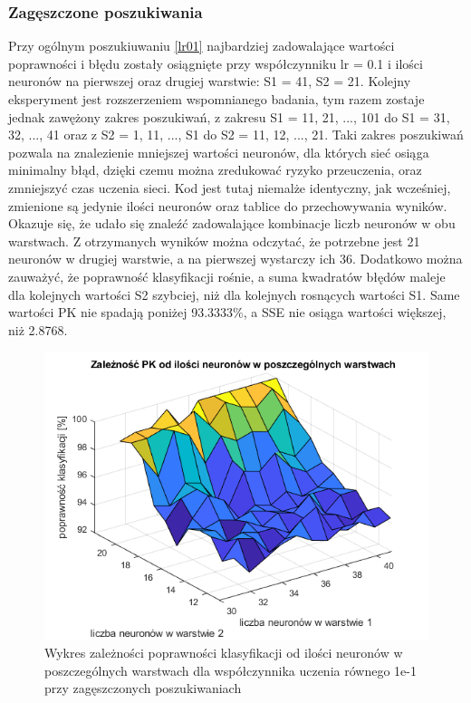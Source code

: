 \documentclass[a4paper, 12pt]{article}
\begin{document}
\subsubsection{Zagęszczone poszukiwania}\label{zageszczone}
Przy ogólnym poszukiuwaniu \ref{lr01} najbardziej zadowalające wartości poprawności i błędu zostały osiągnięte przy współczynniku lr = 0.1 i ilości neuronów na pierwszej oraz drugiej warstwie: S1 = 41, S2 = 21. Kolejny eksperyment jest rozszerzeniem wspomnianego badania, tym razem zostaje jednak zawężony zakres poszukiwań, z zakresu S1 = 11, 21, ..., 101 do S1 = 31, 32, ..., 41 oraz z S2 = 1, 11, ..., S1 do  S2 = 11, 12, ..., 21. Taki zakres poszukiwań pozwala na znalezienie mniejszej wartości neuronów, dla których sieć osiąga minimalny błąd, dzięki czemu można zredukować ryzyko przeuczenia, oraz zmniejszyć czas uczenia sieci. Kod jest tutaj niemalże identyczny, jak wcześniej, zmienione są jedynie ilości neuronów oraz tablice do przechowywania wyników.
Okazuje się, że udało się znaleźć zadowalające kombinacje liczb neuronów w obu warstwach. Z otrzymanych wyników można odczytać, że potrzebne jest 21 neuronów w drugiej warstwie, a na pierwszej wystarczy ich 36. Dodatkowo można zauważyć, że poprawność klasyfikacji rośnie, a suma kwadratów błędów maleje dla kolejnych wartości S2 szybciej, niż dla kolejnych rosnących wartości S1. Same wartości PK nie spadają poniżej 93.3333\%, a SSE nie osiąga wartości większej, niż 2.8768.


\begin{figure}[ht]
	\centering
	\includegraphics[width=14cm]{s1s2 pk}
	\caption{Wykres zależności poprawności klasyfikacji od ilości neuronów w poszczególnych warstwach dla współczynnika uczenia równego 1e-1 przy zagęszczonych poszukiwaniach}
\label{Fig:lr1 sse dane}
\end{figure}
\end{document}
